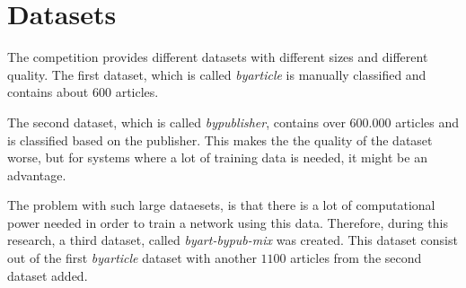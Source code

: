 \section{Datasets}

The competition provides different datasets with different sizes and different quality. The first dataset, which is called \textit{byarticle} is manually classified and contains about 600 articles. 

The second dataset, which is called \textit{bypublisher}, contains over 600.000 articles and is classified based on the publisher. This makes the the quality of the dataset worse, but for systems where a lot of training data is needed, it might be an advantage. 

The problem with such large dataesets, is that there is a lot of computational power needed in order to train a network using this data. Therefore, during this research, a third dataset, called \textit{byart-bypub-mix} was created. This dataset consist out of the first \textit{byarticle} dataset with another $1100$ articles from the second dataset added.